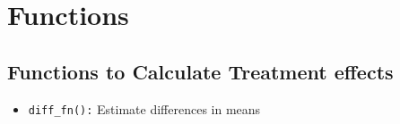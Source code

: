 \documentclass[
]{article}
\providecommand{\tightlist}{%
  \setlength{\itemsep}{0pt}\setlength{\parskip}{0pt}}
\begin{document}
\hypertarget{functions}{%
\section{Functions}\label{functions}}

\hypertarget{functions-to-calculate-treatment-effects}{%
\subsection{Functions to Calculate Treatment
effects}\label{functions-to-calculate-treatment-effects}}

\begin{itemize}
\tightlist
\item
  \texttt{diff\_fn():} Estimate differences in means
\end{itemize}
\end{document}
